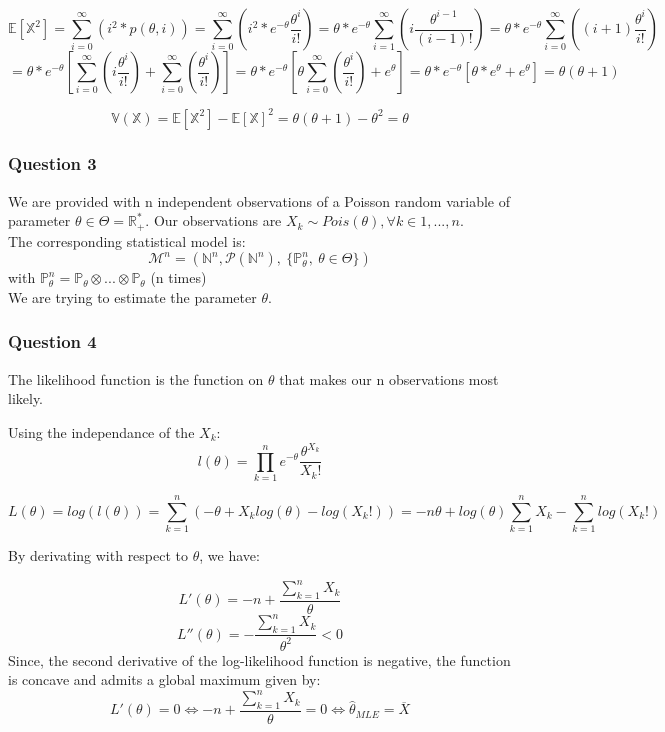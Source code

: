 \documentclass[]{article}
\begin{document}
\[
\mathbb{E}[\mathbb{X}^2] = \sum_{i=0}^{\infty} (i^2 * p(\theta, i)) = \sum_{i=0}^{\infty} (i^2*e^{-\theta} \frac{\theta^{i}}{i!}) = \theta * e^{-\theta}\sum_{i=1}^{\infty} (i\frac{\theta^{i-1}}{(i-1)!}) = \theta * e^{-\theta}\sum_{i=0}^{\infty} ((i+1)\frac{\theta^{i}}{i!})
\] \[
= \theta * e^{-\theta}[\sum_{i=0}^{\infty} (i\frac{\theta^{i}}{i!}) + \sum_{i=0}^{\infty} (\frac{\theta^{i}}{i!})] = \theta * e^{-\theta}[\theta \sum_{i=0}^{\infty} (\frac{\theta^{i}}{i!}) + e^{\theta}] = \theta * e^{-\theta}[\theta * e^{\theta} + e^{\theta}] = \theta (\theta + 1)
\]

\[
\mathbb{V} (\mathbb{X}) = \mathbb{E}[\mathbb{X}^2] - \mathbb{E}[\mathbb{X}]^2 = \theta (\theta + 1) - \theta^2 = \theta
\]

\hypertarget{question-3}{%
\subsubsection{Question 3}\label{question-3}}

We are provided with n independent observations of a Poisson random
variable of parameter \(\theta \in \Theta = \mathbb{R_+^*}\). Our
observations are
\(X_k \sim Pois (\theta), \forall k \in {1, ..., n}\).\\
The corresponding statistical model is:
\[\mathcal{M}^n = (\mathbb{N}^n, \mathcal{P}(\mathbb{N}^n),\ \{\mathbb{P}^n _{\theta},\ \theta \in\Theta \})\]
with
\(\mathbb{P}^n _{\theta} = \mathbb{P} _{\theta} \otimes ... \otimes \mathbb{P} _{\theta}\)
(n times)\\
We are trying to estimate the parameter \(\theta\).

\hypertarget{question-4}{%
\subsubsection{Question 4}\label{question-4}}

The likelihood function is the function on \(\theta\) that makes our n
observations most likely.

Using the independance of the \(X_k\): \[
l(\theta) = \prod_{k=1}^{n} e^{-\theta} \frac{\theta^{X_{k}}}{X_{k}!}
\]

\[
L(\theta) = log(l(\theta)) = \sum_{k=1} ^{n}(- \theta + X_k log(\theta) - log(X_k!)) = - n \theta + log(\theta) \sum_{k=1}^{n}X_{k} - \sum_{k=1}^{n}log(X_{k}!)
\]

By derivating with respect to \(\theta\), we have:

\[
L'(\theta) = -n +\frac{\sum_{k=1}^{n}X_{k}}{\theta} 
\] \[
L''(\theta) = - \frac{\sum_{k=1}^{n}X_{k}}{\theta^2} < 0
\] Since, the second derivative of the log-likelihood function is
negative, the function is concave and admits a global maximum given by:
\[
L'(\theta) = 0 \Leftrightarrow -n +\frac{\sum_{k=1}^{n}X_{k}}{\theta} = 0 \Leftrightarrow \hat\theta_{MLE} = \overline{X}
\]
\end{document}
